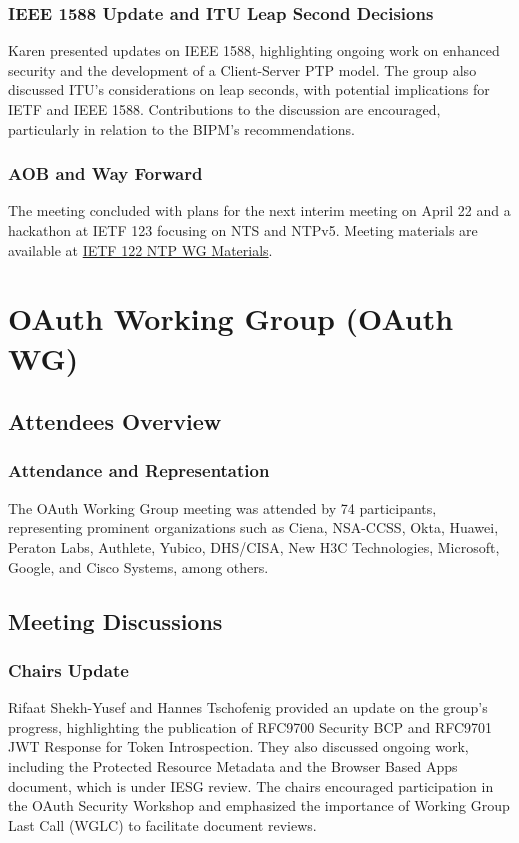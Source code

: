 \documentclass{article}
\begin{document}
\subsubsection{IEEE 1588 Update and ITU Leap Second Decisions}
Karen presented updates on IEEE 1588, highlighting ongoing work on enhanced security and the development of a Client-Server PTP model. The group also discussed ITU's considerations on leap seconds, with potential implications for IETF and IEEE 1588. Contributions to the discussion are encouraged, particularly in relation to the BIPM's recommendations.

\subsubsection{AOB and Way Forward}
The meeting concluded with plans for the next interim meeting on April 22 and a hackathon at IETF 123 focusing on NTS and NTPv5. Meeting materials are available at \href{https://www.ietf.org/proceedings/122/ntp.html}{IETF 122 NTP WG Materials}.



\newpage

\section{OAuth Working Group (OAuth WG)}

\subsection{Attendees Overview}
\subsubsection{Attendance and Representation}
The OAuth Working Group meeting was attended by 74 participants, representing prominent organizations such as Ciena, NSA-CCSS, Okta, Huawei, Peraton Labs, Authlete, Yubico, DHS/CISA, New H3C Technologies, Microsoft, Google, and Cisco Systems, among others.

\subsection{Meeting Discussions}

\subsubsection{Chairs Update}
Rifaat Shekh-Yusef and Hannes Tschofenig provided an update on the group's progress, highlighting the publication of RFC9700 Security BCP and RFC9701 JWT Response for Token Introspection. They also discussed ongoing work, including the Protected Resource Metadata and the Browser Based Apps document, which is under IESG review. The chairs encouraged participation in the OAuth Security Workshop and emphasized the importance of Working Group Last Call (WGLC) to facilitate document reviews.
\end{document}
